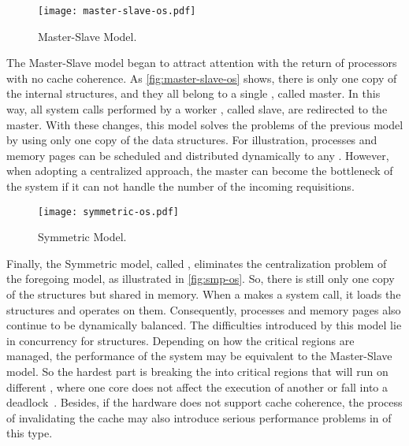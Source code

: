 			\begin{figure}[!tb]
				\centering%
				\caption{Master-Slave \os Model.}%
				\label{fig:master-slave-os}%
				\texttt{[image: master-slave-os.pdf]}%
			\end{figure}

			The Master-Slave model began to attract attention with the return of
			processors with no cache coherence.
			As \autoref{fig:master-slave-os} shows, there is only one copy of
			the internal \os structures, and they all belong to a single \cpu, called master.
			In this way, all system calls performed by a worker \cpu, called slave,
			are redirected to the master.
			With these changes, this model solves the problems of the previous model
			by using only one copy of the data structures.
			For illustration, processes and memory pages can be scheduled and
			distributed dynamically to any \cpus.
			However, when adopting a centralized approach, the master can become
			the bottleneck of the system if it can not handle the number of the
			incoming requisitions.

			\begin{figure}[!tb]
				\centering%
				\caption{Symmetric \os Model.}%
				\label{fig:smp-os}%
				\texttt{[image: symmetric-os.pdf]}%
			\end{figure}

			Finally, the Symmetric model, called \smp, eliminates the centralization
			problem of the foregoing model, as illustrated in \autoref{fig:smp-os}.
			So, there is still only one copy of the \os structures but shared in memory.
			When a \cpu makes a system call, it loads the structures and operates on them.
			Consequently, processes and memory pages also continue to be dynamically balanced.
			The difficulties introduced by this model lie in concurrency for \os structures.
			Depending on how the critical regions are managed, the performance of the system
			may be equivalent to the Master-Slave model. So the hardest part is breaking the
			\os into critical regions that will run on different \cpus, where one core does
			not affect the execution of another or fall into a deadlock~\cite{tanenbaum:4ed}.
			Besides, if the hardware does not support cache coherence, the process of
			invalidating the cache may also introduce serious performance problems in \oss of this type.

